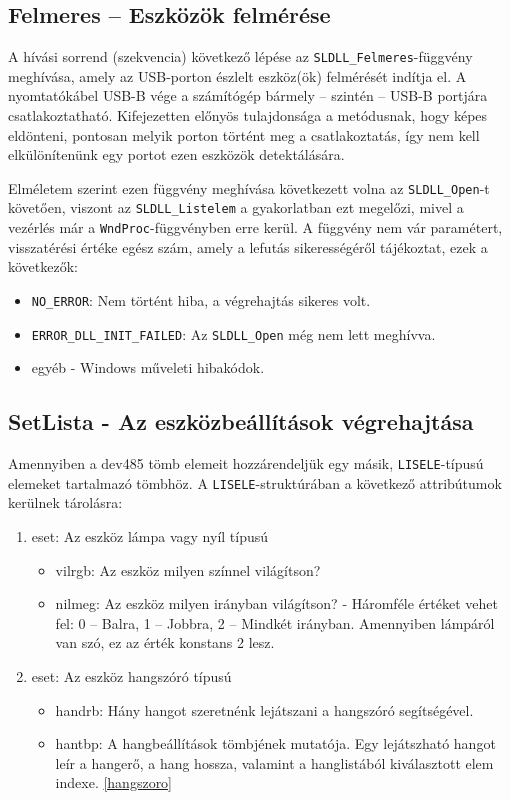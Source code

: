 \documentclass[tocnopagenum]{thesis-ekf}
\begin{document}
	\subsection{Felmeres -- Eszközök felmérése}
	A hívási sorrend (szekvencia) következő lépése az \verb*|SLDLL_Felmeres|-függvény meghívása, amely az USB-porton észlelt eszköz(ök) felmérését indítja el. A nyomtatókábel USB-B vége a számítógép bármely -- szintén -- USB-B portjára csatlakoztatható. Kifejezetten előnyös tulajdonsága a metódusnak, hogy képes eldönteni, pontosan melyik porton történt meg a csatlakoztatás, így nem kell elkülönítenünk egy portot ezen eszközök detektálására.
	
	Elméletem szerint ezen függvény meghívása következett volna az \verb*|SLDLL_Open|-t követően, viszont az \verb*|SLDLL_Listelem| a gyakorlatban ezt megelőzi, mivel a vezérlés már a \verb*|WndProc|-függvényben erre kerül.  A függvény nem vár paramétert, visszatérési értéke egész szám, amely a lefutás sikerességéről tájékoztat, ezek a következők:
	\begin{itemize}
		\item \verb*|NO_ERROR|: Nem történt hiba, a végrehajtás sikeres volt.
		\item \verb*|ERROR_DLL_INIT_FAILED|: Az \verb*|SLDLL_Open| még nem lett meghívva.
		\item egyéb - Windows műveleti hibakódok.
	\end{itemize}
	\subsection{SetLista - Az eszközbeállítások végrehajtása}
	Amennyiben a dev485 tömb elemeit hozzárendeljük egy másik, \verb*|LISELE|-típusú elemeket tartalmazó tömbhöz. A \verb*|LISELE|-struktúrában a következő attribútumok kerülnek tárolásra: 
	\begin{enumerate}
		\item eset: Az eszköz lámpa vagy nyíl típusú
		\begin{itemize}
			\item vilrgb: Az eszköz milyen színnel világítson?
			\item nilmeg: Az eszköz milyen irányban világítson? - Háromféle értéket vehet fel: 0 -- Balra, 1 -- Jobbra, 2 -- Mindkét irányban. Amennyiben lámpáról van szó, ez az érték konstans 2 lesz.
		\end{itemize}
		\item eset: Az eszköz hangszóró típusú
		\begin{itemize}
			\item handrb: Hány hangot szeretnénk lejátszani a hangszóró segítségével.
			\item hantbp: A hangbeállítások tömbjének mutatója. Egy lejátszható hangot leír a hangerő, a hang hossza, valamint a hanglistából kiválasztott elem indexe. \ref{hangszoro}
		\end{itemize}
	\end{enumerate}
\end{document}
